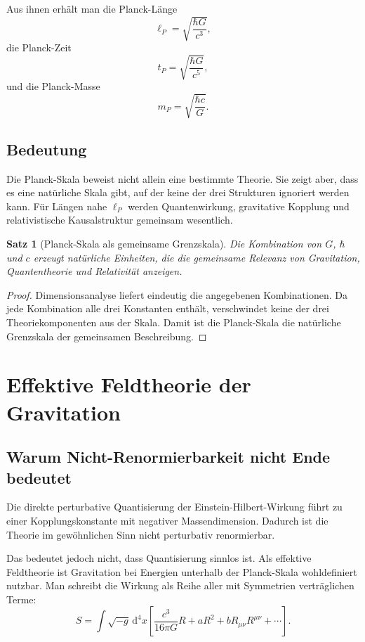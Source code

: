\documentclass[11pt,a4paper]{book}
\newtheorem{satz}{Satz}[chapter]
\theoremstyle{remark}
\newcommand{\diff}{\mathrm{d}}
\begin{document}
Aus ihnen erhält man die Planck-Länge
\begin{equation}
\ell_P=\sqrt{\frac{\hbar G}{c^3}},
\end{equation}
die Planck-Zeit
\begin{equation}
t_P=\sqrt{\frac{\hbar G}{c^5}},
\end{equation}
und die Planck-Masse
\begin{equation}
m_P=\sqrt{\frac{\hbar c}{G}}.
\end{equation}

\section{Bedeutung}
Die Planck-Skala beweist nicht allein eine bestimmte Theorie. Sie zeigt aber, dass es eine natürliche Skala gibt, auf der keine der drei Strukturen ignoriert werden kann. Für Längen nahe $\ell_P$ werden Quantenwirkung, gravitative Kopplung und relativistische Kausalstruktur gemeinsam wesentlich.

\begin{satz}[Planck-Skala als gemeinsame Grenzskala]
Die Kombination von $G$, $\hbar$ und $c$ erzeugt natürliche Einheiten, die die gemeinsame Relevanz von Gravitation, Quantentheorie und Relativität anzeigen.
\end{satz}

\begin{proof}
Dimensionsanalyse liefert eindeutig die angegebenen Kombinationen. Da jede Kombination alle drei Konstanten enthält, verschwindet keine der drei Theoriekomponenten aus der Skala. Damit ist die Planck-Skala die natürliche Grenzskala der gemeinsamen Beschreibung.
\end{proof}

\chapter{Effektive Feldtheorie der Gravitation}
\section{Warum Nicht-Renormierbarkeit nicht Ende bedeutet}
Die direkte perturbative Quantisierung der Einstein-Hilbert-Wirkung führt zu einer Kopplungskonstante mit negativer Massendimension. Dadurch ist die Theorie im gewöhnlichen Sinn nicht perturbativ renormierbar.

Das bedeutet jedoch nicht, dass Quantisierung sinnlos ist. Als effektive Feldtheorie ist Gravitation bei Energien unterhalb der Planck-Skala wohldefiniert nutzbar. Man schreibt die Wirkung als Reihe aller mit Symmetrien verträglichen Terme:
\begin{equation}
S=\int \sqrt{-g}\,\diff^4x\left[\frac{c^3}{16\pi G}R + a R^2 + b R_{\mu\nu}R^{\mu\nu}+\cdots\right].
\end{equation}
\end{document}
